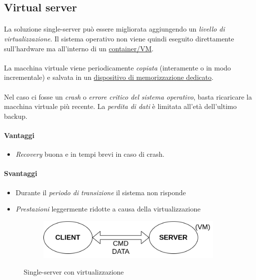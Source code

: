 \documentclass{article}
\begin{document}
\subsection{Virtual server}

\paragraph{} La soluzione single-server può essere migliorata aggiungendo un \emph{livello di virtualizzazione}. Il sistema operativo non viene quindi eseguito direttamente sull'hardware ma all'interno di un \underline{container/VM}. 

\paragraph{} La macchina virtuale viene periodicamente \emph{copiata} (interamente o in modo incrementale) e salvata in un \underline{dispositivo di memorizzazione dedicato}. 

\paragraph{} Nel caso ci fosse un \emph{crash} o \emph{errore critico del sistema operativo}, basta ricaricare la macchina virtuale più recente. La \emph{perdita di dati} è limitata all'età dell'ultimo backup. 

\paragraph{Vantaggi} \begin{itemize}
	\item \emph{Recovery} buona e in tempi brevi in caso di crash. 
\end{itemize}


\paragraph{Svantaggi} \begin{itemize}
	\item Durante il \emph{periodo di transizione} il sistema non risponde
	\item \emph{Prestazioni} leggermente ridotte a causa della virtualizzazione
\end{itemize}

\begin{figure}[H]
	\centering
	\begin{subfigure}{0.60\linewidth}
		\includegraphics[width=\linewidth]{../diagrams/architettura/2.png}
	\end{subfigure}
	\caption{Single-server con virtualizzazione}
\end{figure}
\end{document}
